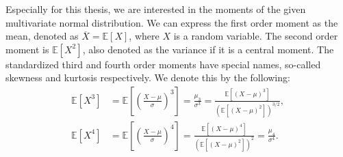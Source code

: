 Especially for this thesis, we are interested in the moments of the given multivariate normal distribution.
We can express the first order moment as the mean,
denoted as $\overline{X} = \mathbb{E}[X]$, where $X$ is a random variable.
The second order moment is $\mathbb{E}[X^2]$, also denoted as the variance if it is a central moment.
The standardized third and fourth order moments have special names,
so-called skewness and kurtosis respectively.
We denote this by the following:
\begin{align}
	\mathbb{E}[X^3]
	&= \mathbb{E}\left[\left(\frac{X-\mu}{\sigma}\right)^3\right]
	= \frac{\mu_3}{\sigma^3}
	= \frac{\mathbb{E}[(X-\mu)^3]}{(\mathbb{E}[(X-\mu)^2])^{3/2}}, \\
	\mathbb{E}[X^4]
	&= \mathbb{E}\left[\left(\frac{X-\mu}{\sigma}\right)^4\right]
	= \frac{\mathbb{E}[(X-\mu)^4]}{(\mathbb{E}[(X-\mu)^2])^2}
	= \frac{\mu_4}{\sigma^4}.
\end{align}
